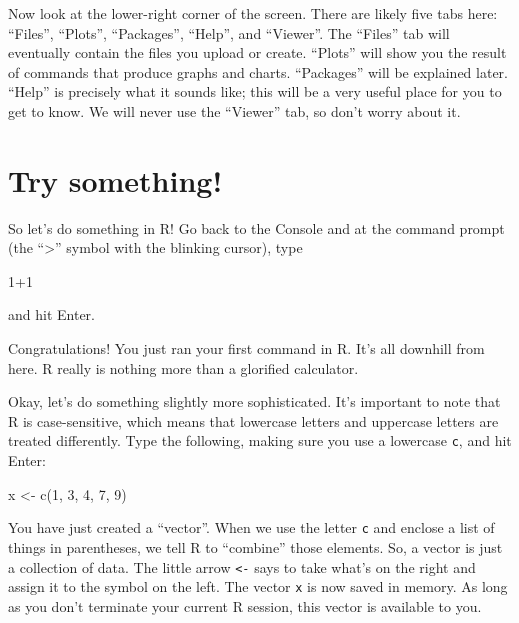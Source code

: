 \documentclass[
]{book}
\newenvironment{Shaded}{\begin{snugshade}}{\end{snugshade}}
\newcommand{\DecValTok}[1]{\textcolor[rgb]{0.00,0.00,0.81}{#1}}
\newcommand{\FunctionTok}[1]{\textcolor[rgb]{0.00,0.00,0.00}{#1}}
\newcommand{\NormalTok}[1]{#1}
\newcommand{\OtherTok}[1]{\textcolor[rgb]{0.56,0.35,0.01}{#1}}
\newcommand{\SpecialCharTok}[1]{\textcolor[rgb]{0.00,0.00,0.00}{#1}}
\begin{document}
Now look at the lower-right corner of the screen. There are likely five tabs here: ``Files'', ``Plots'', ``Packages'', ``Help'', and ``Viewer''. The ``Files'' tab will eventually contain the files you upload or create. ``Plots'' will show you the result of commands that produce graphs and charts. ``Packages'' will be explained later. ``Help'' is precisely what it sounds like; this will be a very useful place for you to get to know. We will never use the ``Viewer'' tab, so don't worry about it.

\hypertarget{intror-trysomething}{%
\section{Try something!}\label{intror-trysomething}}

So let's do something in R! Go back to the Console and at the command prompt (the ``\textgreater{}'' symbol with the blinking cursor), type

\begin{Shaded}
\begin{Highlighting}[]
\DecValTok{1}\SpecialCharTok{+}\DecValTok{1}
\end{Highlighting}
\end{Shaded}

and hit Enter.

Congratulations! You just ran your first command in R. It's all downhill from here. R really is nothing more than a glorified calculator.

Okay, let's do something slightly more sophisticated. It's important to note that R is case-sensitive, which means that lowercase letters and uppercase letters are treated differently. Type the following, making sure you use a lowercase \texttt{c}, and hit Enter:

\begin{Shaded}
\begin{Highlighting}[]
\NormalTok{x }\OtherTok{\textless{}{-}} \FunctionTok{c}\NormalTok{(}\DecValTok{1}\NormalTok{, }\DecValTok{3}\NormalTok{, }\DecValTok{4}\NormalTok{, }\DecValTok{7}\NormalTok{, }\DecValTok{9}\NormalTok{)}
\end{Highlighting}
\end{Shaded}

You have just created a ``vector''. When we use the letter \texttt{c} and enclose a list of things in parentheses, we tell R to ``combine'' those elements. So, a vector is just a collection of data. The little arrow \texttt{\textless{}-} says to take what's on the right and assign it to the symbol on the left. The vector \texttt{x} is now saved in memory. As long as you don't terminate your current R session, this vector is available to you.
\end{document}
